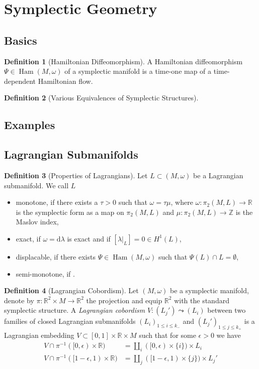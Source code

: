 \documentclass[a4paper]{article}
\newcommand{\RR}{\mathbb{R}}
\newcommand{\ZZ}{\mathbb{Z}}
\newcommand{\dd}{\mathrm{d}}
\newcommand{\lra}{\longrightarrow}
\theoremstyle{definition}
\theoremstyle{definition}
\newtheorem{definition}{Definition}
\theoremstyle{remark}
\theoremstyle{remark}
\theoremstyle{remark}
\begin{document}
\section{Symplectic Geometry}

\subsection{Basics}

\begin{definition}[Hamiltonian Diffeomorphism]
  A Hamiltonian diffeomorphism $\Psi\in\operatorname{Ham}(M,\omega)$ of a symplectic manifold is a time-one map of a time-dependent Hamiltonian flow.
\end{definition}

\begin{definition}[Various Equivalences of Symplectic Structures]
  
\end{definition}

\subsection{Examples}

\subsection{Lagrangian Submanifolds}

\begin{definition}[Properties of Lagrangians]
Let $L\subset (M,\omega)$ be a Lagrangian submanifold. We call $L$
\begin{itemize}
  \item monotone, if there exists a $\tau>0$ such that $\omega=\tau\mu$, where $\omega:\pi_2(M,L)\lra\RR$ is the symplectic form as a map on $\pi_2(M,L)$ and $\mu:\pi_2(M,L)\lra\ZZ$ is the Maslov index,
  \item exact, if $\omega=\dd\lambda$ is exact and if $[\lambda|_L]=0\in H^1(L)$,
  \item displacable, if there exists $\Psi\in\operatorname{Ham}(M,\omega)$ such that $\Psi(L)\cap L=\emptyset$,
  \item semi-monotone, if .
\end{itemize}
\end{definition}

\begin{definition}[Lagrangian Cobordism]
  Let $(M,\omega)$ be a symplectic manifold, denote by $\pi:\RR^2\times M\lra\RR^2$ the projection and equip $\RR^2$ with the standard symplectic structure. A \emph{Lagrangian cobordism} $V:(L_j')\leadsto(L_i)$ between two families of closed Lagrangian submanifolds $(L_i)_{1\leq i\leq k_-}$ and $(L_j')_{1\leq j\leq k_+}$  is a Lagrangian embedding $V\subset [0,1]\times\RR\times M$ such that for some $\epsilon>0$ we have
  \begin{align*}
    V\cap\pi^{-1}([0,\epsilon)\times \RR)&=\coprod_i([0,\epsilon)\times\{i\})\times L_i \\
    V\cap\pi^{-1}([1-\epsilon,1)\times \RR)&=\coprod_j([1-\epsilon,1)\times\{j\})\times L_j'
  \end{align*}
\end{definition}
\end{document}
